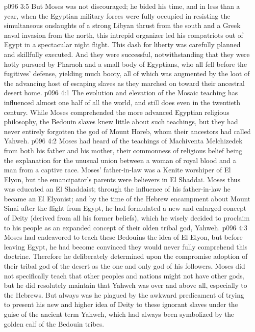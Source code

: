 \vs p096 3:5 But Moses was not discouraged; he bided his time, and in less than a year, when the Egyptian military forces were fully occupied in resisting the simultaneous onslaughts of a strong Libyan thrust from the south and a Greek naval invasion from the north, this intrepid organizer led his compatriots out of Egypt in a spectacular night flight. This dash for liberty was carefully planned and skillfully executed. And they were successful, notwithstanding that they were hotly pursued by Pharaoh and a small body of Egyptians, who all fell before the fugitives’ defense, yielding much booty, all of which was augmented by the loot of the advancing host of escaping slaves as they marched on toward their ancestral desert home.
\vs p096 4:1 The evolution and elevation of the Mosaic teaching has influenced almost one half of all the world, and still does even in the twentieth century. While Moses comprehended the more advanced Egyptian religious philosophy, the Bedouin slaves knew little about such teachings, but they had never entirely forgotten the god of Mount Horeb, whom their ancestors had called Yahweh.
\vs p096 4:2 Moses had heard of the teachings of Machiventa Melchizedek from both his father and his mother, their commonness of religious belief being the explanation for the unusual union between a woman of royal blood and a man from a captive race. Moses’ father\hyp{}in\hyp{}law was a Kenite worshiper of El Elyon, but the emancipator’s parents were believers in El Shaddai. Moses thus was educated an El Shaddaist; through the influence of his father\hyp{}in\hyp{}law he became an El Elyonist; and by the time of the Hebrew encampment about Mount Sinai after the flight from Egypt, he had formulated a new and enlarged concept of Deity (derived from all his former beliefs), which he wisely decided to proclaim to his people as an expanded concept of their olden tribal god, Yahweh.
\vs p096 4:3 Moses had endeavored to teach these Bedouins the idea of El Elyon, but before leaving Egypt, he had become convinced they would never fully comprehend this doctrine. Therefore he deliberately determined upon the compromise adoption of their tribal god of the desert as the one and only god of his followers. Moses did not specifically teach that other peoples and nations might not have other gods, but he did resolutely maintain that Yahweh was over and above all, especially to the Hebrews. But always was he plagued by the awkward predicament of trying to present his new and higher idea of Deity to these ignorant slaves under the guise of the ancient term Yahweh, which had always been symbolized by the golden calf of the Bedouin tribes.
